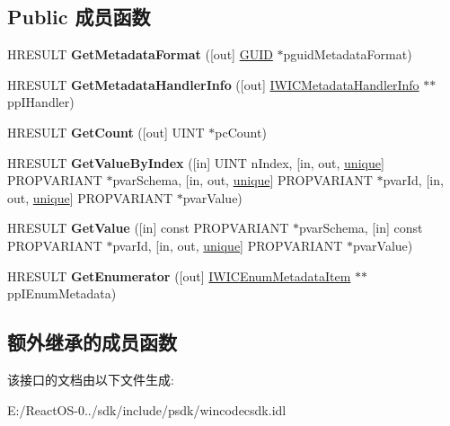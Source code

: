 \subsection*{Public 成员函数}
\begin{DoxyCompactItemize}
\item 
\mbox{\label{interface_i_w_i_c_metadata_reader_a18fc5753d349e90d3cb66c9d2113336c}} 
H\+R\+E\+S\+U\+LT {\bfseries Get\+Metadata\+Format} (\mbox{[}out\mbox{]} \hyperlink{interface_g_u_i_d}{G\+U\+ID} $\ast$pguid\+Metadata\+Format)
\item 
\mbox{\label{interface_i_w_i_c_metadata_reader_a30561033098b7f2dbf452cf975d98e29}} 
H\+R\+E\+S\+U\+LT {\bfseries Get\+Metadata\+Handler\+Info} (\mbox{[}out\mbox{]} \hyperlink{interface_i_w_i_c_metadata_handler_info}{I\+W\+I\+C\+Metadata\+Handler\+Info} $\ast$$\ast$pp\+I\+Handler)
\item 
\mbox{\label{interface_i_w_i_c_metadata_reader_ad98b991c2c9f84e767d6e9325a5be383}} 
H\+R\+E\+S\+U\+LT {\bfseries Get\+Count} (\mbox{[}out\mbox{]} U\+I\+NT $\ast$pc\+Count)
\item 
\mbox{\label{interface_i_w_i_c_metadata_reader_a64ae944e24ea72a496270d5e57138dd2}} 
H\+R\+E\+S\+U\+LT {\bfseries Get\+Value\+By\+Index} (\mbox{[}in\mbox{]} U\+I\+NT n\+Index, \mbox{[}in, out, \hyperlink{interfaceunique}{unique}\mbox{]} P\+R\+O\+P\+V\+A\+R\+I\+A\+NT $\ast$pvar\+Schema, \mbox{[}in, out, \hyperlink{interfaceunique}{unique}\mbox{]} P\+R\+O\+P\+V\+A\+R\+I\+A\+NT $\ast$pvar\+Id, \mbox{[}in, out, \hyperlink{interfaceunique}{unique}\mbox{]} P\+R\+O\+P\+V\+A\+R\+I\+A\+NT $\ast$pvar\+Value)
\item 
\mbox{\label{interface_i_w_i_c_metadata_reader_a7523ffc355b4b31a994a62a382d77aff}} 
H\+R\+E\+S\+U\+LT {\bfseries Get\+Value} (\mbox{[}in\mbox{]} const P\+R\+O\+P\+V\+A\+R\+I\+A\+NT $\ast$pvar\+Schema, \mbox{[}in\mbox{]} const P\+R\+O\+P\+V\+A\+R\+I\+A\+NT $\ast$pvar\+Id, \mbox{[}in, out, \hyperlink{interfaceunique}{unique}\mbox{]} P\+R\+O\+P\+V\+A\+R\+I\+A\+NT $\ast$pvar\+Value)
\item 
\mbox{\label{interface_i_w_i_c_metadata_reader_ad9dcfc42ecec083849e4bb082760518d}} 
H\+R\+E\+S\+U\+LT {\bfseries Get\+Enumerator} (\mbox{[}out\mbox{]} \hyperlink{interface_i_w_i_c_enum_metadata_item}{I\+W\+I\+C\+Enum\+Metadata\+Item} $\ast$$\ast$pp\+I\+Enum\+Metadata)
\end{DoxyCompactItemize}
\subsection*{额外继承的成员函数}


该接口的文档由以下文件生成\+:\begin{DoxyCompactItemize}
\item 
E\+:/\+React\+O\+S-\/0../sdk/include/psdk/wincodecsdk.\+idl\end{DoxyCompactItemize}
